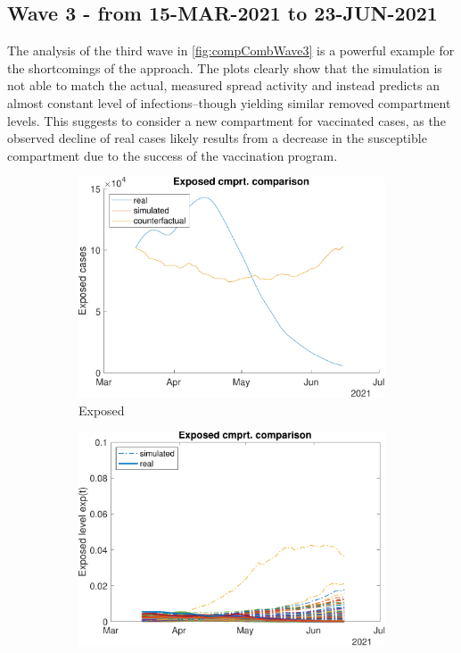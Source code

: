 \subsection{Wave 3 - from 15-MAR-2021 to 23-JUN-2021}

The analysis of the third wave in \autoref{fig:compCombWave3} is a powerful example for the shortcomings of the approach. The plots clearly show that the simulation is not able to match the actual, measured spread activity and instead predicts an almost constant level of infections--though yielding similar removed compartment levels. This suggests to consider a new compartment for vaccinated cases, as the observed decline of real cases likely results from a decrease in the susceptible compartment due to the success of the vaccination program.

\begin{figure}[hbtp]
     \centering
     \begin{subfigure}[b]{.45\linewidth}
         \centering
         \includegraphics[width=\linewidth]{img/210907_224100_combined_wave3/figures/COMP_exp}
         \caption{Exposed}
         \label{fig:compAggrCombWave3Exp}
     \end{subfigure}
     \hfill
     \begin{subfigure}[b]{.45\linewidth}
         \centering
         \includegraphics[width=\linewidth]{img/210907_224100_combined_wave3/figures/SEIR_e_sim-vs-real}

\end{subfigure}
\end{figure}
